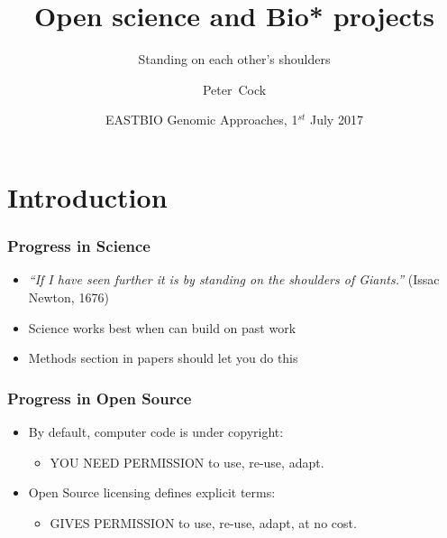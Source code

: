 


\title[Open science and Bio* projects] %
{Open science and Bio* projects}
\subtitle{Standing on each other's shoulders}
\author[Cock] %
{Peter~Cock}
\date[July 2017] %
{EASTBIO Genomic Approaches, 1$^{st}$ July 2017}
\subject{Bioinformatics}





\frame[plain]{\titlepage}

\section{Introduction}

\begin{frame}
  \frametitle{Progress in Science}
  \begin{itemize}
    \item \emph{``If I have seen further it is by standing on the shoulders of Giants.''} (Issac Newton, 1676)
    \item Science works best when can build on past work
    \item Methods section in papers should let you do this
  \end{itemize}
\end{frame}

\begin{frame}
  \frametitle{Progress in Open Source}
  \begin{itemize}
    \item By default, computer code is under copyright:
      \begin{itemize}
        \item YOU NEED PERMISSION to use, re-use, adapt.
      \end{itemize}
    \item Open Source licensing defines explicit terms:
      \begin{itemize}
        \item GIVES PERMISSION to use, re-use, adapt, at no cost.
      \end{itemize}
  \end{itemize}
\end{frame}


